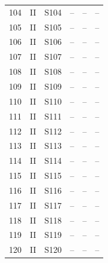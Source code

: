 \begin{longtable}{cccccc}
104 & II & S104 & -- & -- & --\\
105 & II & S105 & -- & -- & --\\
106 & II & S106 & -- & -- & --\\
107 & II & S107 & -- & -- & --\\
108 & II & S108 & -- & -- & --\\
109 & II & S109 & -- & -- & --\\
110 & II & S110 & -- & -- & --\\
111 & II & S111 & -- & -- & --\\
112 & II & S112 & -- & -- & --\\
113 & II & S113 & -- & -- & --\\
114 & II & S114 & -- & -- & --\\
115 & II & S115 & -- & -- & --\\
116 & II & S116 & -- & -- & --\\
117 & II & S117 & -- & -- & --\\
118 & II & S118 & -- & -- & --\\
119 & II & S119 & -- & -- & --\\
120 & II & S120 & -- & -- & --\\
\bottomrule
\end{longtable}
\normalsize
